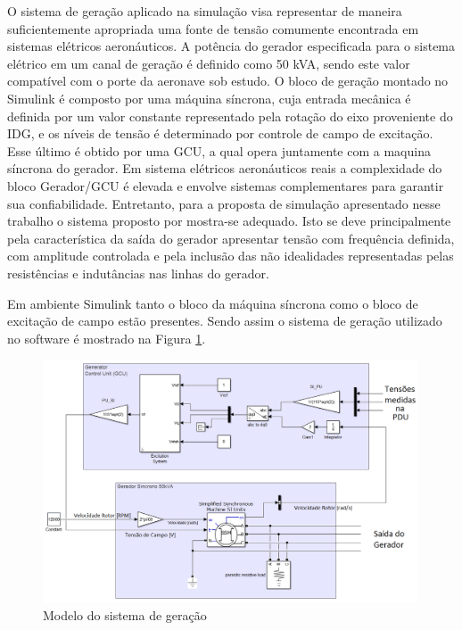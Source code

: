O sistema de geração aplicado na simulação visa representar de maneira suficientemente apropriada uma fonte de tensão comumente encontrada em sistemas elétricos aeronáuticos. A potência do gerador especificada para o sistema elétrico em um canal de geração é definido como 50 kVA, sendo este valor compatível com o porte da aeronave sob estudo. O bloco de geração montado no Simulink é composto por uma máquina síncrona, cuja entrada mecânica é definida por um valor constante representado pela rotação do eixo proveniente do IDG, e os níveis de tensão é determinado por controle de campo de excitação. Esse último é obtido por uma GCU, a qual opera juntamente com a maquina síncrona do gerador. Em sistema elétricos aeronáuticos reais a complexidade do bloco Gerador/GCU é elevada e envolve sistemas complementares para garantir sua confiabilidade. Entretanto, para a proposta de simulação apresentado nesse trabalho o sistema proposto por \cite{Olivier} mostra-se adequado. Isto se deve principalmente pela característica da saída do gerador apresentar tensão com frequência definida, com amplitude controlada e pela inclusão das não idealidades representadas pelas resistências e indutâncias nas linhas do gerador.

Em ambiente Simulink tanto o bloco da máquina síncrona como o bloco de excitação de campo estão presentes. Sendo assim o sistema de geração utilizado no software é mostrado na Figura \ref{fig:GEN_GCU.png}.

\begin{figure}[!htb] %
	\centering
	\includegraphics[width=0.99\textwidth]{Cap4/Figuras/GEN_GCU.png}
	\caption{Modelo do sistema de geração}
	\label{fig:GEN_GCU.png}
\end{figure}

